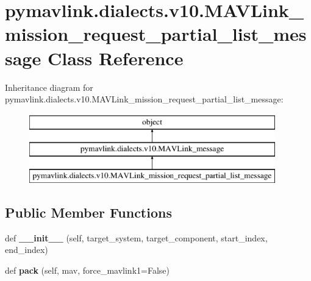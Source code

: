 \hypertarget{classpymavlink_1_1dialects_1_1v10_1_1MAVLink__mission__request__partial__list__message}{}\section{pymavlink.\+dialects.\+v10.\+M\+A\+V\+Link\+\_\+mission\+\_\+request\+\_\+partial\+\_\+list\+\_\+message Class Reference}
\label{classpymavlink_1_1dialects_1_1v10_1_1MAVLink__mission__request__partial__list__message}
Inheritance diagram for pymavlink.\+dialects.\+v10.\+M\+A\+V\+Link\+\_\+mission\+\_\+request\+\_\+partial\+\_\+list\+\_\+message\+:\begin{figure}[H]
\begin{center}
\leavevmode
\includegraphics[height=3.000000cm]{classpymavlink_1_1dialects_1_1v10_1_1MAVLink__mission__request__partial__list__message}
\end{center}
\end{figure}
\subsection*{Public Member Functions}
\begin{DoxyCompactItemize}
\item 
\mbox{\label{classpymavlink_1_1dialects_1_1v10_1_1MAVLink__mission__request__partial__list__message_afc4910299c1b8a6dfcc850f7f4519140}} 
def {\bfseries \+\_\+\+\_\+init\+\_\+\+\_\+} (self, target\+\_\+system, target\+\_\+component, start\+\_\+index, end\+\_\+index)
\item 
\mbox{\label{classpymavlink_1_1dialects_1_1v10_1_1MAVLink__mission__request__partial__list__message_a9cf29a0cbe454e8c845ba06d1c000ee6}} 
def {\bfseries pack} (self, mav, force\+\_\+mavlink1=False)
\end{DoxyCompactItemize}
